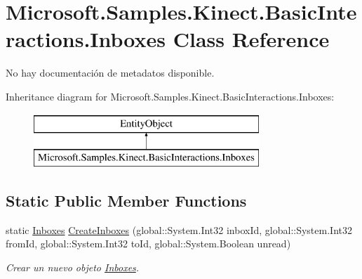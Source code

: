 \hypertarget{class_microsoft_1_1_samples_1_1_kinect_1_1_basic_interactions_1_1_inboxes}{\section{Microsoft.\-Samples.\-Kinect.\-Basic\-Interactions.\-Inboxes Class Reference}
\label{class_microsoft_1_1_samples_1_1_kinect_1_1_basic_interactions_1_1_inboxes}
}


No hay documentación de metadatos disponible.  


Inheritance diagram for Microsoft.\-Samples.\-Kinect.\-Basic\-Interactions.\-Inboxes\-:\begin{figure}[H]
\begin{center}
\leavevmode
\includegraphics[height=2.000000cm]{class_microsoft_1_1_samples_1_1_kinect_1_1_basic_interactions_1_1_inboxes}
\end{center}
\end{figure}
\subsection*{Static Public Member Functions}
\begin{DoxyCompactItemize}
\item 
static \hyperlink{class_microsoft_1_1_samples_1_1_kinect_1_1_basic_interactions_1_1_inboxes}{Inboxes} \hyperlink{class_microsoft_1_1_samples_1_1_kinect_1_1_basic_interactions_1_1_inboxes_a52f525615a9d625d1f491854dcfdf301}{Create\-Inboxes} (global\-::\-System.\-Int32 inbox\-Id, global\-::\-System.\-Int32 from\-Id, global\-::\-System.\-Int32 to\-Id, global\-::\-System.\-Boolean unread)
\begin{DoxyCompactList}\small\item\em Crear un nuevo objeto \hyperlink{class_microsoft_1_1_samples_1_1_kinect_1_1_basic_interactions_1_1_inboxes}{Inboxes}. \end{DoxyCompactList}\end{DoxyCompactItemize}
